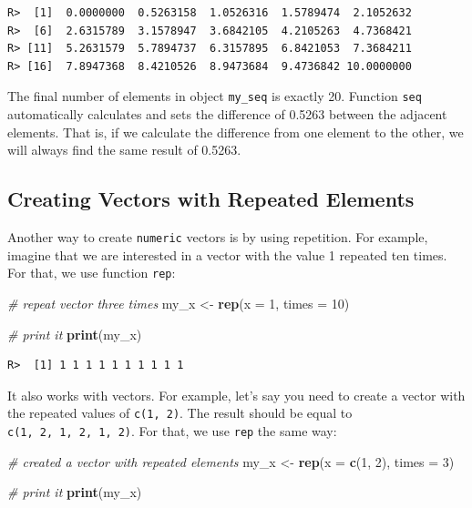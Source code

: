\documentclass[
  12pt,
]{book}
\newenvironment{Shaded}{\begin{snugshade}}{\end{snugshade}}
\newcommand{\CommentTok}[1]{\textcolor[rgb]{0.37,0.37,0.37}{\textit{#1}}}
\newcommand{\DataTypeTok}[1]{\textcolor[rgb]{0.27,0.27,0.27}{#1}}
\newcommand{\DecValTok}[1]{\textcolor[rgb]{0.06,0.06,0.06}{#1}}
\newcommand{\KeywordTok}[1]{\textcolor[rgb]{0.27,0.27,0.27}{\textbf{#1}}}
\newcommand{\NormalTok}[1]{#1}
\newcommand{\StringTok}[1]{\textcolor[rgb]{0.5,0.5,0.5}{#1}}
\begin{document}
\begin{verbatim}
R>  [1]  0.0000000  0.5263158  1.0526316  1.5789474  2.1052632
R>  [6]  2.6315789  3.1578947  3.6842105  4.2105263  4.7368421
R> [11]  5.2631579  5.7894737  6.3157895  6.8421053  7.3684211
R> [16]  7.8947368  8.4210526  8.9473684  9.4736842 10.0000000
\end{verbatim}

The final number of elements in object \texttt{my\_seq} is exactly 20. Function \texttt{seq} automatically calculates and sets the difference of 0.5263 between the adjacent elements. That is, if we calculate the difference from one element to the other, we will always find the same result of 0.5263.

\hypertarget{creating-vectors-with-repeated-elements}{%
\subsection{Creating Vectors with Repeated Elements}\label{creating-vectors-with-repeated-elements}}

Another way to create \texttt{numeric} vectors is by using repetition. For example, imagine that we are interested in a vector with the value 1 repeated ten times. For that, we use function \texttt{rep}: 

\begin{Shaded}
\begin{Highlighting}[]
\CommentTok{# repeat vector three times}
\NormalTok{my_x <-}\StringTok{ }\KeywordTok{rep}\NormalTok{(}\DataTypeTok{x =} \DecValTok{1}\NormalTok{, }\DataTypeTok{times =} \DecValTok{10}\NormalTok{)}

\CommentTok{# print it}
\KeywordTok{print}\NormalTok{(my_x)}
\end{Highlighting}
\end{Shaded}

\begin{verbatim}
R>  [1] 1 1 1 1 1 1 1 1 1 1
\end{verbatim}

It also works with vectors. For example, let's say you need to create a vector with the repeated values of \texttt{c(1,\ 2)}. The result should be equal to \texttt{c(1,\ 2,\ 1,\ 2,\ 1,\ 2)}. For that, we use \texttt{rep} the same way:

\begin{Shaded}
\begin{Highlighting}[]
\CommentTok{# created a vector with repeated elements}
\NormalTok{my_x <-}\StringTok{ }\KeywordTok{rep}\NormalTok{(}\DataTypeTok{x =} \KeywordTok{c}\NormalTok{(}\DecValTok{1}\NormalTok{, }\DecValTok{2}\NormalTok{), }
            \DataTypeTok{times =} \DecValTok{3}\NormalTok{)}

\CommentTok{# print it}
\KeywordTok{print}\NormalTok{(my_x)}
\end{Highlighting}
\end{Shaded}
\end{document}
